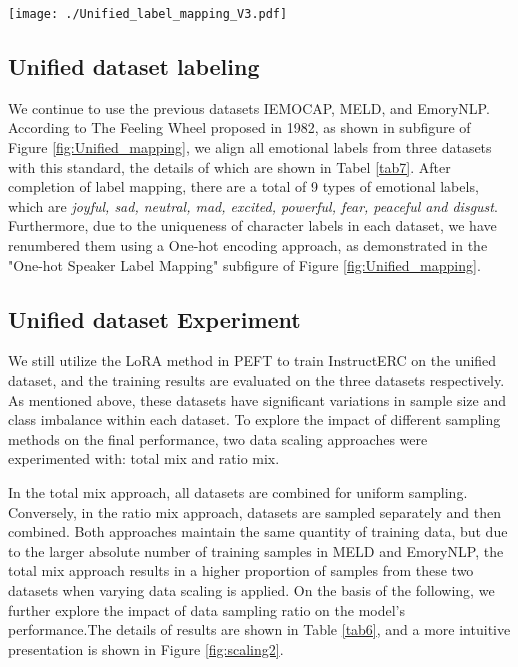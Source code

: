 \documentclass[conference]{IEEEtran}
\begin{document}
\begin{figure*}
    \centering
    \texttt{[image: ./Unified\_label\_mapping\_V3.pdf]}
    \caption{Unified Label Mapping Across three Open-source Benchmarks. The Feeling Wheel is proposed by \cite{willcox1982feeling}}
    \label{fig:Unified_mapping}
\end{figure*}

\subsection{Unified dataset labeling}


We continue to use the previous datasets IEMOCAP, MELD, and EmoryNLP.
According to The Feeling Wheel \cite{willcox1982feeling} proposed in 1982, as shown in subfigure of Figure \ref{fig:Unified_mapping}, we align all emotional labels from three datasets with this standard, the details of which are shown in Tabel \ref{tab7}.
After completion of label mapping, there are a total of 9 types of emotional labels, which are \textit{ joyful, sad, neutral, mad, excited, powerful, fear, peaceful and disgust}. 
Furthermore, due to the uniqueness of character labels in each dataset, we have renumbered them using a One-hot encoding approach, as demonstrated in the "One-hot Speaker Label Mapping" subfigure of Figure \ref{fig:Unified_mapping}.



\subsection{Unified dataset Experiment}
We still utilize the LoRA method in PEFT to train InstructERC on the unified dataset, and the training results are evaluated on the three datasets respectively.
As mentioned above, these datasets have significant variations in sample size and class imbalance within each dataset. To explore the impact of different sampling methods on the final performance, two data scaling approaches were experimented with: total mix and ratio mix.

In the total mix approach, all datasets are combined for uniform sampling. Conversely, in the ratio mix approach, datasets are sampled separately and then combined. Both approaches maintain the same quantity of training data, but due to the larger absolute number of training samples in MELD and EmoryNLP, the total mix approach results in a higher proportion of samples from these two datasets when varying data scaling is applied.
On the basis of the following, we further explore the impact of data sampling ratio on the model's performance.The details of results are shown in Table \ref{tab6}, and a more intuitive presentation is shown in Figure \ref{fig:scaling2}.
\end{document}
